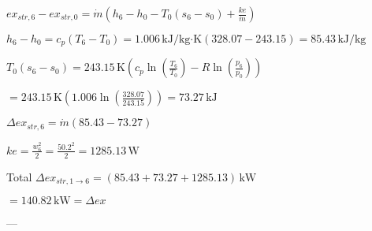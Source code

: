 \( ex_{str,6} - ex_{str,0} = \dot{m} (h_6 - h_0 - T_0 (s_6 - s_0) + \frac{ke}{\dot{m}} ) \)  

\( h_6 - h_0 = c_p (T_6 - T_0) = 1.006 \, \text{kJ/kg·K} (328.07 - 243.15) = 85.43 \, \text{kJ/kg} \)  

\( T_0 (s_6 - s_0) = 243.15 \, \text{K} \left( c_p \ln \left( \frac{T_6}{T_0} \right) - R \ln \left( \frac{p_6}{p_0} \right) \right) \)  

\( = 243.15 \, \text{K} \left( 1.006 \ln \left( \frac{328.07}{243.15} \right) \right) = 73.27 \, \text{kJ} \)  

\( \Delta ex_{str,6} = \dot{m} (85.43 - 73.27) \)  

\( ke = \frac{w_6^2}{2} = \frac{50.2^2}{2} = 1285.13 \, \text{W} \)  

Total \( \Delta ex_{str,1 \to 6} = (85.43 + 73.27 + 1285.13) \, \text{kW} \)  

\( = 140.82 \, \text{kW} = \Delta ex \)  

---